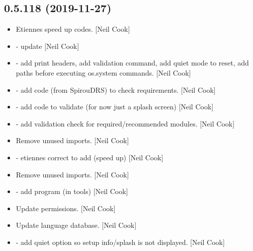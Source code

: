 \documentclass[a4paper,10pt,english]{report}
\begin{document}
\subsection{0.5.118 (2019-11-27)}
\label{\detokenize{misc/changelog:id25}}\begin{itemize}
\item {} 
Etiennes speed up codes. {[}Neil Cook{]}

\item {} 
 - update  {[}Neil Cook{]}

\item {} 
 - add print headers, add
validation command, add quiet mode to reset, add paths before
executing os.system commands. {[}Neil Cook{]}

\item {} 
 - add code (from SpirouDRS) to check
requirements. {[}Neil Cook{]}

\item {} 
 - add code to validate (for now just a splash
screen) {[}Neil Cook{]}

\item {} 
 - add validation check for required/recommended
modules. {[}Neil Cook{]}

\item {} 
Remove unused imports. {[}Neil Cook{]}

\item {} 
 - etiennes correct to
add (speed up) {[}Neil Cook{]}

\item {} 
Remove unused imports. {[}Neil Cook{]}

\item {} 
 - add 
program (in tools) {[}Neil Cook{]}

\item {} 
Update permissions. {[}Neil Cook{]}

\item {} 
Update language database. {[}Neil Cook{]}

\item {} 
 - add quiet option so setup info/splash is not
displayed. {[}Neil Cook{]}


\end{itemize}
\end{document}
